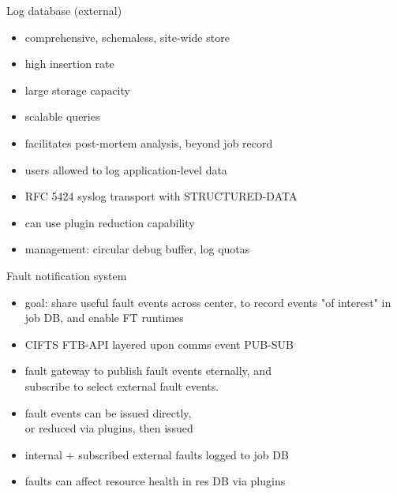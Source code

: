 \documentclass[default,pdf,colorBG,slideColor]{prosper}
\begin{document}
\begin{slide}{Log database (external)}{\small
\begin{minipage}[b]{0.55\linewidth}
\begin{itemize}
  \item{comprehensive, schemaless, site-wide store}
  \item{high insertion rate}
\end{itemize}
\end{minipage}
\hfill
\begin{minipage}[b]{0.40\linewidth}
\begin{center}
\end{center}
\end{minipage}
\hfill
\begin{itemize}
  \item{large storage capacity}
  \item{scalable queries}
  \item{facilitates post-mortem analysis, beyond job record}
  \item{users allowed to log application-level data}
  \item{RFC 5424 syslog transport with STRUCTURED-DATA}
  \item{can use plugin reduction capability}
  \item{management: circular debug buffer, log quotas}
\end{itemize}
}\end{slide}
\begin{slide}{Fault notification system}{\small
\begin{itemize}
  \item{goal: share useful fault events across center, to record events
       "of interest" in job DB, and enable FT runtimes}
  \item{CIFTS FTB-API layered upon comms event PUB-SUB}
  \item{fault gateway to publish fault events eternally, and\\
	subscribe to select external fault events.}
  \item{fault events can be issued directly,\\
	or reduced via plugins, then issued}
  \item{internal $+$ subscribed external faults logged to job DB}
  \item{faults can affect resource health in res DB via plugins}
\end{itemize}
}\end{slide}
\end{document}
